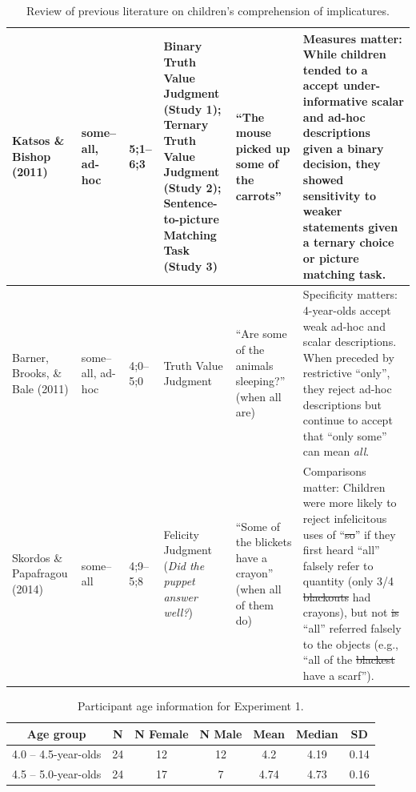 \documentclass[man]{apa2}
\providecommand{\DIFadd}[1]{{\protect\color{blue}\uwave{#1}}} %
\providecommand{\DIFdel}[1]{{\protect\color{red}\sout{#1}}}                      %
\providecommand{\DIFaddbegin}{} %
\providecommand{\DIFaddend}{} %
\providecommand{\DIFaddFL}[1]{\DIFadd{#1}} %
\providecommand{\DIFdelFL}[1]{\DIFdel{#1}} %
\providecommand{\DIFaddbeginFL}{} %
\providecommand{\DIFaddendFL}{} %
\providecommand{\DIFdelbeginFL}{} %
\providecommand{\DIFdelendFL}{} %
\begin{document}
{\begin{landscape}
\begin{table}[!ht]
\begin{tabular}{| p{2.2cm} | p{2cm} | p{1.69cm} | p{4.5cm} | p{5cm} | p{7.2cm} |}
Katsos \& Bishop (2011) & some--all, ad-hoc & 5;1--6;3  & \parbox[t]{4.5cm}{Binary Truth Value Judgment\\(Study 1); Ternary Truth\\Value Judgment (Study 2);\\Sentence-to-picture Matching Task\\(Study 3)} & ``The mouse picked up some of the carrots'' & Measures matter: While children tended to a accept under-informative scalar and ad-hoc descriptions given a binary decision, they showed sensitivity to weaker statements given a ternary choice or picture matching task. \\ \hline
Barner, Brooks, \& Bale (2011) & some--all, ad-hoc & 4;0--5;0 &Truth Value Judgment & ``Are some of the animals sleeping?'' (when all are) & Specificity matters: 4-year-olds accept weak ad-hoc and scalar descriptions. When preceded by restrictive ``only'', they reject ad-hoc descriptions but continue to accept that ``only some'' can mean \emph{all}.\\ \hline
\parbox[t]{2.2cm}{Skordos \&\\Papafragou (2014)} & some--all & 4;9--5;8 & Felicity Judgment (\textit{Did the puppet answer well?}) & ``Some of the blickets have a crayon'' (when all of them do)  & Comparisons matter: Children were more likely to reject infelicitous uses of ``\DIFdelbeginFL \DIFdelFL{so}\DIFdelendFL \DIFaddbeginFL \DIFaddFL{some}\DIFaddendFL '' if they first heard ``all'' falsely refer to quantity (only 3/4 \DIFdelbeginFL \DIFdelFL{blackouts }\DIFdelendFL \DIFaddbeginFL \DIFaddFL{blickets }\DIFaddendFL had crayons), but not \DIFdelbeginFL \DIFdelFL{is }\DIFdelendFL \DIFaddbeginFL \DIFaddFL{if }\DIFaddendFL ``all'' referred falsely to the objects (e.g., ``all of the \DIFdelbeginFL \DIFdelFL{blackest }\DIFdelendFL \DIFaddbeginFL \DIFaddFL{blickets }\DIFaddendFL have a scarf'').\\ \hline \end{tabular}
\caption{\label{tab:lit_review}Review of previous literature on children's comprehension of implicatures.}
\end{table}
\end{landscape}
\restoregeometry

\DIFaddbegin \newpage

\DIFaddend \begin{table}[tb]
\centering
\begin{tabular}{ccccccc}
\hline
{\bf Age group} & {\bf N} & {\bf N Female} & {\bf N Male} & {\bf Mean} & {\bf Median} & {\bf SD} \\
\hline
4.0 -- 4.5-year-olds & 24 & 12 & 12 & 4.2 & 4.19 & 0.14 \\
4.5 -- 5.0-year-olds & 24 & 17 & 7 & 4.74 & 4.73 & 0.16\\
\hline
\end{tabular}
\caption{\label{tab:exp_1_demo}Participant age information for Experiment 1.}
\end{table}

}
\end{document}

